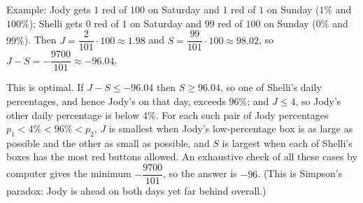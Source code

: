 Example: Jody gets $1$ red of $100$ on Saturday and $1$ red of $1$ on Sunday ($1\%$ and $100\%$); Shelli gets $0$ red of $1$ on Saturday and $99$ red of $100$ on Sunday ($0\%$ and $99\%$). Then $J=\dfrac2{101}\cdot100\approx1.98$ and $S=\dfrac{99}{101}\cdot100\approx98.02$, so $J-S=-\dfrac{9700}{101}\approx-96.04$.

This is optimal. If $J-S\le-96.04$ then $S\ge96.04$, so one of Shelli's daily percentages, and hence Jody's on that day, exceeds $96\%$; and $J\le4$, so Jody's other daily percentage is below $4\%$. For each such pair of Jody percentages $p_1<4\%<96\%<p_2$, $J$ is smallest when Jody's low-percentage box is as large as possible and the other as small as possible, and $S$ is largest when each of Shelli's boxes has the most red buttons allowed. An exhaustive check of all these cases by computer gives the minimum $-\dfrac{9700}{101}$, so the answer is $\boxed{-96}$. (This is Simpson's paradox: Jody is ahead on both days yet far behind overall.)
